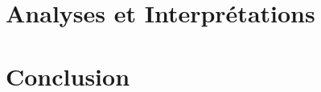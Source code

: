 \documentclass[french]{article}
\theoremstyle{mytheoremstyle}
\theoremstyle{mytheoremstyle}
\theoremstyle{myproblemstyle}
\begin{document}
        \subsubsection{}
        
    \section{Analyses et Interprétations}
    \section{Conclusion}
\end{document}
